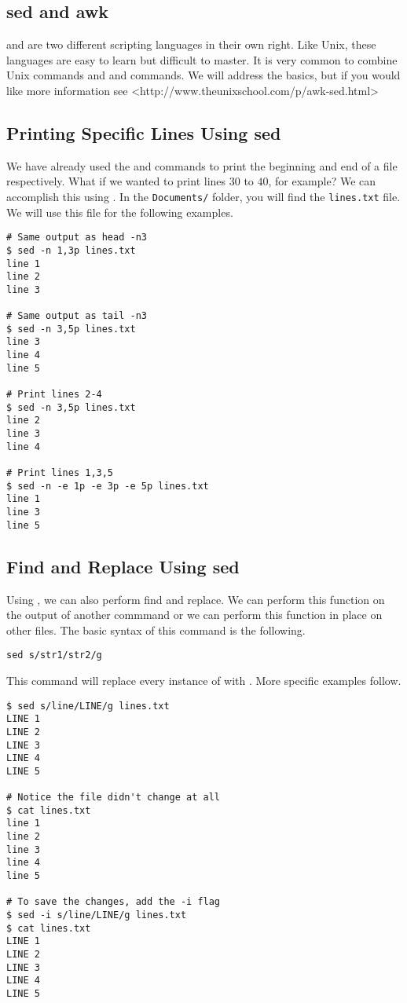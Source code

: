 \subsection*{sed and awk}
 and  are two different scripting languages in their own right.
Like Unix, these languages are easy to learn but difficult to master.
It is very common to combine Unix commands and  and  commands.
We will address the basics, but if you would like more information see <http://www.theunixschool.com/p/awk-sed.html>

\subsection*{Printing Specific Lines Using sed}
We have already used the  and  commands to print the beginning and end of a file respectively.
What if we wanted to print lines $30$ to $40$, for example?
We can accomplish this using .
In the \texttt{Documents/} folder, you will find the \texttt{lines.txt} file.
We will use this file for the following examples.

\begin{lstlisting}
# Same output as head -n3
$ sed -n 1,3p lines.txt
line 1
line 2
line 3

# Same output as tail -n3
$ sed -n 3,5p lines.txt
line 3
line 4
line 5

# Print lines 2-4
$ sed -n 3,5p lines.txt
line 2
line 3
line 4

# Print lines 1,3,5
$ sed -n -e 1p -e 3p -e 5p lines.txt
line 1
line 3
line 5
\end{lstlisting}

\subsection*{Find and Replace Using sed}

Using , we can also perform find and replace.
We can perform this function on the output of another commmand or we can perform this function in place on other files.
The basic syntax of this  command is the following.

\begin{lstlisting}
sed s/str1/str2/g
\end{lstlisting}

This command will replace every instance of  with . More specific examples follow.

\begin{lstlisting}
$ sed s/line/LINE/g lines.txt
LINE 1
LINE 2
LINE 3
LINE 4
LINE 5

# Notice the file didn't change at all
$ cat lines.txt
line 1
line 2
line 3
line 4
line 5

# To save the changes, add the -i flag
$ sed -i s/line/LINE/g lines.txt
$ cat lines.txt
LINE 1
LINE 2
LINE 3
LINE 4
LINE 5
\end{lstlisting}

